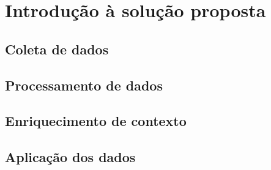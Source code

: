 \chapter{Introdução à solução proposta}

\section{Coleta de dados}
\section{Processamento de dados}
\section{Enriquecimento de contexto}
\section{Aplicação dos dados}
